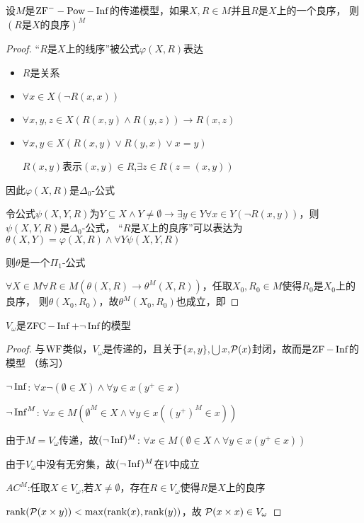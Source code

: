 \documentclass[11pt]{article}
\begin{document}
\begin{lemma}[\(\ZFm\)]
\label{7.5.4}
设\(M\)是\(\text{ZF}^--\operatorname{Pow}-\operatorname{Inf}\)的传递模型，如果\(X,R\in M\)并且\(R\)是\(X\)上的一个良序，
则\((R\text{是$X$的良序})^M\)
\end{lemma}

\begin{proof}
“\(R\)是\(X\)上的线序”被公式\(\varphi(X,R)\)表达
\begin{itemize}
\item \(R\)是关系
\item \(\forall x\in X(\neg R(x,x))\)
\item \(\forall x,y,z\in X(R(x,y)\wedge R(y,z))\to R(x,z)\)
\item \(\forall x,y\in X(R(x,y)\vee R(y,x)\vee x=y)\)

\(R(x,y)\)表示\((x,y)\in R\),\(\exists z\in R(z=(x,y))\)
\end{itemize}


因此\(\varphi(X,R)\)是\(\Delta_0\)-公式

令公式\(\psi(X,Y,R)\)为\(Y\subseteq X\wedge Y\neq\emptyset\to\exists y\in Y\forall x\in Y(\neg R(x,y))\)，则\(\psi(X,Y,R)\)是\(\Delta_0\)-公式，
“\(R\)是\(X\)上的良序”可以表达为\(\theta(X,Y)=\varphi(X,R)\wedge\forall Y\psi(X,Y,R)\)

则\(\theta\)是一个\(\Pi_1\)-公式

\(\forall X\in  M\forall R\in M(\theta(X,R)\to\theta^M(X,R))\)，任取\(X_0,R_0\in M\)使得\(R_0\)是\(X_0\)上的良序，
则\(\theta(X_0,R_0)\)，故\(\theta^M(X_0,R_0)\)也成立，即
\end{proof}

\begin{theorem}[\(\ZFm\)]
\(V_\omega\)是\(\operatorname{ZFC}-\operatorname{Inf}+\neg\operatorname{Inf}\)的模型
\end{theorem}

\begin{proof}
与\(\operatorname{WF}\)类似，\(V_\omega\)是传递的，且关于\(\{x,y\}\),\(\bigcup x\),\(\mathcal{P}(x)\)封闭，故而是\(\operatorname{ZF}-\operatorname{Inf}\)的模型
（练习）

\(\neg\operatorname{Inf}\): \(\forall x\neg(\emptyset\in X)\wedge\forall y\in x(y^+\in x)\)

\(\neg\operatorname{Inf}^M\): \(\forall x\in M(\emptyset^M\in X\wedge\forall y\in x((y^+)^M\in x))\)

由于\(M=V_\omega\)传递，故\((\neg\operatorname{Inf})^M\): \(\forall x\in M(\emptyset\in X\wedge\forall y\in x(y^+\in x))\)

由于\(V_\omega\)中没有无穷集，故\((\neg\operatorname{Inf})^M\)在\(V\)中成立

\(AC^M\):任取\(X\in V_\omega\),若\(X\neq\emptyset\)，存在\(R\in V_\omega\)使得\(R\)是\(X\)上的良序

\(\text{rank}(\mathcal{P}(x\times y))<\max(\text{rank}(x),\text{rank}(y))\)，故
\(\mathcal{P}(x\times x)\in V_\omega\)
\end{proof}
\end{document}
